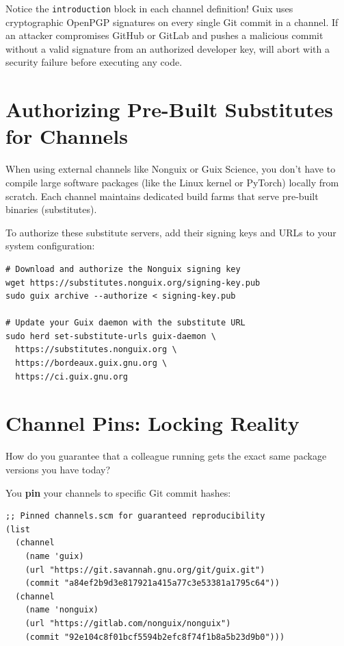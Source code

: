 \begin{alchemybox}
Notice the \texttt{introduction} block in each channel definition! Guix uses cryptographic OpenPGP signatures on every single Git commit in a channel. 
If an attacker compromises GitHub or GitLab and pushes a malicious commit without a valid signature from an authorized developer key,  will abort with a security failure before executing any code.
\end{alchemybox}

\section{Authorizing Pre-Built Substitutes for Channels}

When using external channels like Nonguix or Guix Science, you don't have to compile large software packages (like the Linux kernel or PyTorch) locally from scratch. Each channel maintains dedicated build farms that serve pre-built binaries (substitutes).

To authorize these substitute servers, add their signing keys and URLs to your system configuration:

\begin{lstlisting}[style=guixcli]
# Download and authorize the Nonguix signing key
wget https://substitutes.nonguix.org/signing-key.pub
sudo guix archive --authorize < signing-key.pub

# Update your Guix daemon with the substitute URL
sudo herd set-substitute-urls guix-daemon \
  https://substitutes.nonguix.org \
  https://bordeaux.guix.gnu.org \
  https://ci.guix.gnu.org
\end{lstlisting}

\section{Channel Pins: Locking Reality}

How do you guarantee that a colleague running  gets the exact same package versions you have today?

You \textbf{pin} your channels to specific Git commit hashes:

\begin{lstlisting}[style=guixscheme]
;; Pinned channels.scm for guaranteed reproducibility
(list
  (channel
    (name 'guix)
    (url "https://git.savannah.gnu.org/git/guix.git")
    (commit "a84ef2b9d3e817921a415a77c3e53381a1795c64"))
  (channel
    (name 'nonguix)
    (url "https://gitlab.com/nonguix/nonguix")
    (commit "92e104c8f01bcf5594b2efc8f74f1b8a5b23d9b0")))
\end{lstlisting}

